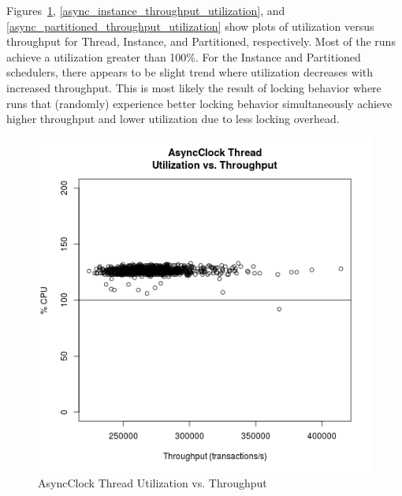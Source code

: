 Figures~\ref{async_thread_throughput_utilization}, \ref{async_instance_throughput_utilization}, and \ref{async_partitioned_throughput_utilization} show plots of utilization versus throughput for Thread, Instance, and Partitioned, respectively.
Most of the runs achieve a utilization greater than 100\%.
For the Instance and Partitioned schedulers, there appears to be slight trend where utilization decreases with increased throughput.
This is most likely the result of locking behavior where runs that (randomly) experience better locking behavior simultaneously achieve higher throughput and lower utilization due to less locking overhead.

\begin{figure}
\center
\includegraphics[height=.4\textheight]{async_thread_throughput_utilization.png}
\caption{AsyncClock Thread Utilization vs. Throughput}
\label{async_thread_throughput_utilization}
\end{figure}

